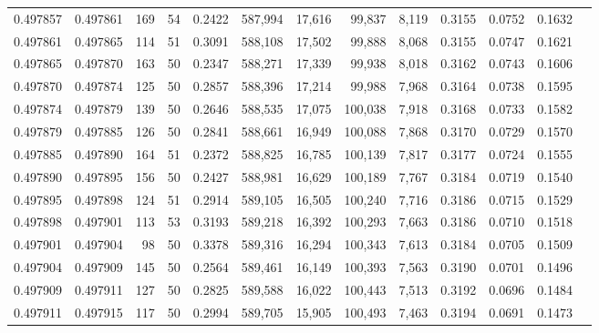 \begin{tabular}{rrrrrrrrrrrrr}
0.497857 & 0.497861 &   169 &  54 &                                     0.2422 & 587,994 &  17,616 &  99,837 &   8,119 & 0.3155 & 0.0752 & 0.1632 \\
0.497861 & 0.497865 &   114 &  51 &                                     0.3091 & 588,108 &  17,502 &  99,888 &   8,068 & 0.3155 & 0.0747 & 0.1621 \\
0.497865 & 0.497870 &   163 &  50 &                                     0.2347 & 588,271 &  17,339 &  99,938 &   8,018 & 0.3162 & 0.0743 & 0.1606 \\
0.497870 & 0.497874 &   125 &  50 &                                     0.2857 & 588,396 &  17,214 &  99,988 &   7,968 & 0.3164 & 0.0738 & 0.1595 \\
0.497874 & 0.497879 &   139 &  50 &                                     0.2646 & 588,535 &  17,075 & 100,038 &   7,918 & 0.3168 & 0.0733 & 0.1582 \\
0.497879 & 0.497885 &   126 &  50 &                                     0.2841 & 588,661 &  16,949 & 100,088 &   7,868 & 0.3170 & 0.0729 & 0.1570 \\
0.497885 & 0.497890 &   164 &  51 &                                     0.2372 & 588,825 &  16,785 & 100,139 &   7,817 & 0.3177 & 0.0724 & 0.1555 \\
0.497890 & 0.497895 &   156 &  50 &                                     0.2427 & 588,981 &  16,629 & 100,189 &   7,767 & 0.3184 & 0.0719 & 0.1540 \\
0.497895 & 0.497898 &   124 &  51 &                                     0.2914 & 589,105 &  16,505 & 100,240 &   7,716 & 0.3186 & 0.0715 & 0.1529 \\
0.497898 & 0.497901 &   113 &  53 &                                     0.3193 & 589,218 &  16,392 & 100,293 &   7,663 & 0.3186 & 0.0710 & 0.1518 \\
0.497901 & 0.497904 &    98 &  50 &                                     0.3378 & 589,316 &  16,294 & 100,343 &   7,613 & 0.3184 & 0.0705 & 0.1509 \\
0.497904 & 0.497909 &   145 &  50 &                                     0.2564 & 589,461 &  16,149 & 100,393 &   7,563 & 0.3190 & 0.0701 & 0.1496 \\
0.497909 & 0.497911 &   127 &  50 &                                     0.2825 & 589,588 &  16,022 & 100,443 &   7,513 & 0.3192 & 0.0696 & 0.1484 \\
0.497911 & 0.497915 &   117 &  50 &                                     0.2994 & 589,705 &  15,905 & 100,493 &   7,463 & 0.3194 & 0.0691 & 0.1473 \\

\end{tabular}
